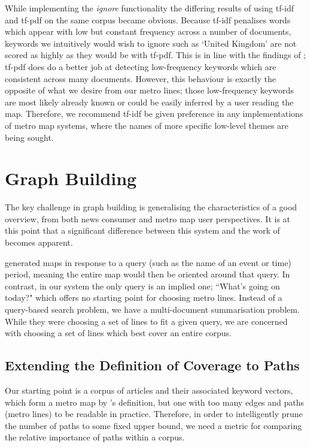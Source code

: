 While implementing the \textit{ignore} functionality the differing results of using tf-idf and tf-pdf on the same corpus became obvious. Because tf-idf penalises words which appear with low but constant frequency across a number of documents, keywords we intuitively would wish to ignore such as `United Kingdom' are not scored as highly as they would be with tf-pdf. This is in line with the findings of \citeauthor{TopicExtractionfromnewsArchiveUsingTFPDFAlgorithm}; tf-pdf does do a better job at detecting low-frequency keywords which are consistent across many documents. However, this behaviour is exactly the opposite of what we desire from our metro lines; those low-frequency keywords are most likely already known or could be easily inferred by a user reading the map. Therefore, we recommend tf-idf be given preference in any implementations of metro map systems, where the names of more specific low-level themes are being sought.

\clearpage

\section{Graph Building} 

The key challenge in graph building is generalising the characteristics of a good overview, from both news consumer and metro map user perspectives. It is at this point that a significant difference between this system and the work of \cite{MetroMapsOfScience, GeneratingInformationMaps, InformationCartographyPre} becomes apparent. 

\citeauthor{GeneratingInformationMaps} generated maps in response to a query (such as the name of an event or time) period, meaning the entire map would then be oriented around that query. In contrast, in our system the only query is an implied one; ``What's going on today?" which offers no starting point for choosing metro lines. Instead of a query-based search problem, we have a multi-document summarisation problem. While they were choosing a set of lines to fit a given query, we are concerned with choosing a set of lines which best cover an entire corpus.

\subsection{Extending the Definition of Coverage to Paths}\label{sec:linecoverage}

Our starting point is a corpus of articles and their associated keyword vectors, which form a metro map by \citeauthor{GeneratingInformationMaps}'s definition, but one with too many edges and paths (metro lines) to be readable in practice. Therefore, in order to intelligently prune the number of paths to some fixed upper bound, we need a metric for comparing the relative importance of paths within a corpus.

